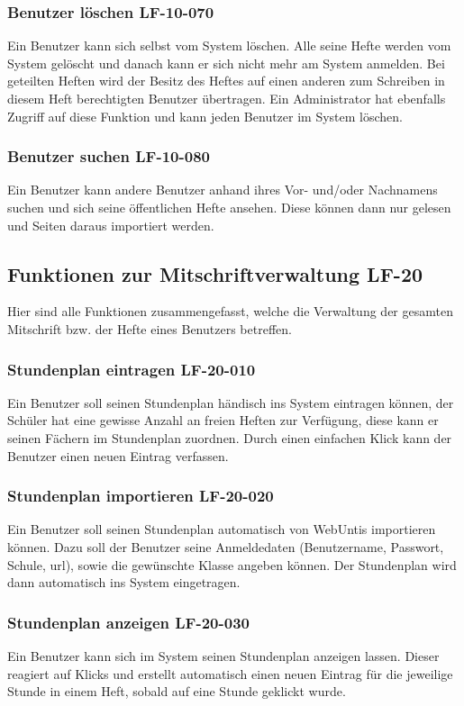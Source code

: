 \documentclass[12pt,a4paper,oneside,ngerman]{scrartcl}
\begin{document}
\subsubsection{Benutzer löschen \hfill LF-10-070}
Ein Benutzer kann sich selbst vom System löschen. Alle seine Hefte werden vom System gelöscht und danach kann er sich nicht mehr am System anmelden. Bei geteilten Heften wird der Besitz des Heftes auf einen anderen zum Schreiben in diesem Heft berechtigten Benutzer übertragen. Ein Administrator hat ebenfalls Zugriff auf diese Funktion und kann jeden Benutzer im System löschen.

\subsubsection{Benutzer suchen \hfill LF-10-080}
Ein Benutzer kann andere Benutzer anhand ihres Vor- und/oder Nachnamens suchen und sich seine öffentlichen Hefte ansehen. Diese können dann nur gelesen und Seiten daraus importiert werden.

\subsection[Funktionen zur Mitschriftverwaltung]{Funktionen zur Mitschriftverwaltung \hfill LF-20}
Hier sind alle Funktionen zusammengefasst, welche die Verwaltung der gesamten Mitschrift bzw. der Hefte eines Benutzers betreffen.

\subsubsection{Stundenplan eintragen \hfill LF-20-010}
Ein Benutzer soll seinen Stundenplan händisch ins System eintragen können, der Schüler hat eine gewisse Anzahl an freien Heften zur Verfügung, diese kann er seinen Fächern im Stundenplan zuordnen. Durch einen einfachen Klick kann der Benutzer einen neuen Eintrag verfassen.

\subsubsection{Stundenplan importieren \hfill LF-20-020}
Ein Benutzer soll seinen Stundenplan automatisch von \gls{WebUntis} importieren können. Dazu soll der Benutzer seine Anmeldedaten (Benutzername, Passwort, Schule, \gls{url}), sowie die gewünschte Klasse angeben können. Der Stundenplan wird dann automatisch ins System eingetragen.

\subsubsection{Stundenplan anzeigen \hfill LF-20-030}
Ein Benutzer kann sich im System seinen Stundenplan anzeigen lassen. Dieser reagiert auf Klicks und erstellt automatisch einen neuen Eintrag für die jeweilige Stunde in einem Heft, sobald auf eine Stunde geklickt wurde.
\end{document}
